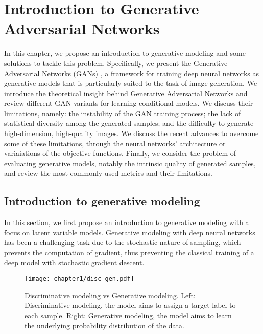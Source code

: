 \chapter{Introduction to Generative Adversarial Networks }
\label{chap:chapter1}

\begin{chapterabstract}
	In this chapter, we propose an introduction to generative modeling and some solutions to tackle this problem. Specifically, we present the Generative Adversarial Networks (\ac{GANs}) \citep{Goodfellow2014}, a framework for training deep neural networks as generative models that is particularly suited to the task of image generation. We introduce the theoretical insight behind Generative Adversarial Networks and review different \ac{GAN} variants for learning conditional models. We discuss their limitations, namely: the instability of the \ac{GAN} training process; the lack of statistical diversity among the generated samples; and the difficulty to generate high-dimension, high-quality images. We discuss the recent advances to overcome some of these limitations, through the neural networks' architecture or variaiations of the objective functions. Finally,  we consider the problem of evaluating generative models, notably the intrinsic quality of generated samples, and review the most commonly used metrics and their limitations. 
\end{chapterabstract}

\minitoc


\section{Introduction to generative modeling}

In this section, we first propose an introduction to generative modeling with a focus on latent variable models.  Generative modeling with deep neural networks has been a challenging task due to the stochastic nature of sampling, which prevents the computation of gradient, thus preventing the classical training of a deep model with stochastic gradient descent. 

\begin{figure}
	\centering
	\texttt{[image: chapter1/disc\_gen.pdf]}
	\caption[Generative modeling]{Discriminative modeling vs Generative modeling. Left: Discriminative modeling, the model aims to assign a target label to each sample. Right: Generative modeling, the model aims to learn the underlying probability distribution of the data.}
	\label{fig:disc_gen}
\end{figure}



